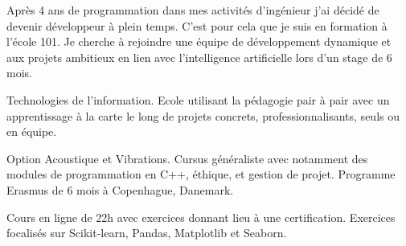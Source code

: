 \documentclass[10pt,a4paper]{altacv}
\begin{document}


\begin{fullwidth}
\makecvheader
\begin{adjustwidth}{30pt}{30pt}
Apr\`es 4 ans de programmation dans mes activit\'es d'ing\'enieur j'ai d\'ecid\'e de devenir d\'eveloppeur \`a plein temps. C'est pour cela que je suis en formation \`a l'\'ecole 101. Je cherche \`a rejoindre une \'equipe de d\'eveloppement dynamique et aux projets ambitieux en lien avec l'intelligence artificielle lors d'un stage de 6 mois.
\end{adjustwidth}
\end{fullwidth}




Technologies de l'information.\linebreak
Ecole utilisant la p\'edagogie pair \`a pair avec un apprentissage \`a la carte le long de projets concrets, professionnalisants, seuls ou en \'equipe.
\divider

Option Acoustique et Vibrations.\linebreak
Cursus g\'en\'eraliste avec notamment des modules de programmation en C++, \'ethique, et gestion de projet. Programme Erasmus de 6 mois \`a Copenhague, Danemark.
\divider

Cours en ligne de 22h avec exercices donnant lieu \`a une certification.\linebreak
Exercices focalis\'es sur Scikit-learn, Pandas, Matplotlib et Seaborn.
\end{document}
